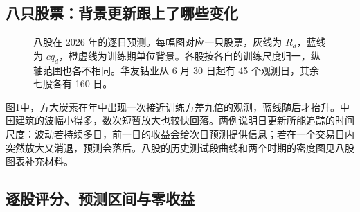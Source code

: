 \documentclass[11pt,a4paper]{article}
\newcommand{\chart}[4]{\begin{figure}[H]\centering\resizebox{#1\linewidth}{!}{}\caption{#3}\label{#4}\end{figure}}
\begin{document}
\clearpage
\subsection{八只股票：背景更新跟上了哪些变化}
\chart{.87}{eight_conditional_scale_2026}{八股在 2026 年的逐日预测。每幅图对应一只股票，灰线为 $R_d$，蓝线为 $c q_d$，橙虚线为训练期单位背景。各股按各自的训练尺度归一，纵轴范围也各不相同。华友钴业从 6 月 30 日起有 45 个观测日，其余七股各有 160 日。}{fig:eightpaths}
图\ref{fig:eightpaths}中，方大炭素在年中出现一次接近训练方差九倍的观测，蓝线随后才抬升。中国建筑的波幅小得多，数次短暂放大也较快回落。两例说明日更新所能追踪的时间尺度：波动若持续多日，前一日的收益会给次日预测提供信息；若在一个交易日内突然放大又消退，预测会落后。八股的历史测试段曲线和两个时期的密度图见八股图表补充材料。

\clearpage
\subsection{逐股评分、预测区间与零收益}
\end{document}
